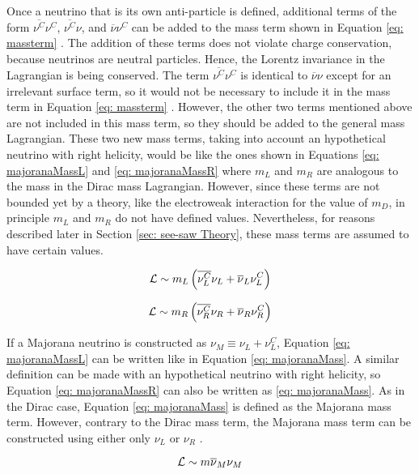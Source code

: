 Once a neutrino that is its own anti-particle is defined, additional terms of the form $\overline{\nu^{C}}\nu^{C}$, $\overline{\nu^{C}}\nu$, and $\overline{\nu}\nu^{C}$ can be added to the mass term shown in Equation \ref{eq: massterm} \cite{NeutrinoMass}. The addition of these terms does not violate charge conservation, because neutrinos are neutral particles. Hence, the Lorentz invariance in the Lagrangian is being conserved. The term $\overline{\nu^{C}}\nu^{C}$ is identical to $\overline{\nu}\nu$ except for an irrelevant surface term, so it would not be necessary to include it in the mass term in Equation \ref{eq: massterm} \cite{NeutrinoMass}. However, the other two terms mentioned above are not included in this mass term, so they should be added to the general mass Lagrangian. These two new mass terms, taking into account an hypothetical neutrino with right helicity, would be like the ones shown in Equations \ref{eq: majoranaMassL} and \ref{eq: majoranaMassR} where $m_{L}$ and $m_{R}$ are analogous to the mass in the Dirac mass Lagrangian. However, since these terms are not bounded yet by a theory, like the electroweak interaction for the value of $m_{D}$, in principle $m_{L}$ and $m_{R}$ do not have defined values. Nevertheless, for reasons described later in Section \ref{sec: see-saw Theory}, these mass terms are assumed to have certain values.

\begin{equation}\label{eq: majoranaMassL}
\mathcal{L} \sim m_{L}\left(\overline{\nu^{C}_{L}}\nu_{L}  + \overline{\nu}_{L}\nu^{C}_{L}\right)
\end{equation}

\begin{equation}\label{eq: majoranaMassR}
\mathcal{L} \sim m_{R}\left(\overline{\nu^{C}_{R}}\nu_{R}  + \overline{\nu}_{R}\nu^{C}_{R}\right) 
\end{equation}

If a Majorana neutrino is constructed as $\nu_{M} \equiv \nu_{L} + \nu_{L}^{C}$, Equation \ref{eq: majoranaMassL} can be written like in Equation \ref{eq: majoranaMass}. A similar definition can be made with an hypothetical neutrino with right helicity, so Equation \ref{eq: majoranaMassR} can also be written as \ref{eq: majoranaMass}. As in the Dirac case, Equation \ref{eq: majoranaMass} is defined as the Majorana mass term. However, contrary to the Dirac mass term, the Majorana mass term can be constructed using either only $\nu_{L}$ or $\nu_{R}$ \cite{NeutrinoMass}. 

\begin{equation}\label{eq: majoranaMass}
\mathcal{L} \sim m\overline{\nu}_{M}\nu_{M}
\end{equation}


